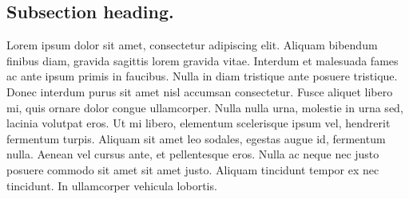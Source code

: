 \subsection*{Subsection heading.}

Lorem ipsum dolor sit amet, consectetur adipiscing elit. Aliquam bibendum finibus diam, gravida sagittis lorem gravida vitae. Interdum et malesuada fames ac ante ipsum primis in faucibus. Nulla in diam tristique ante posuere tristique. Donec interdum purus sit amet nisl accumsan consectetur. Fusce aliquet libero mi, quis ornare dolor congue ullamcorper. Nulla nulla urna, molestie in urna sed, lacinia volutpat eros. Ut mi libero, elementum scelerisque ipsum vel, hendrerit fermentum turpis. Aliquam sit amet leo sodales, egestas augue id, fermentum nulla. Aenean vel cursus ante, et pellentesque eros. Nulla ac neque nec justo posuere commodo sit amet sit amet justo. Aliquam tincidunt tempor ex nec tincidunt. In ullamcorper vehicula lobortis.
